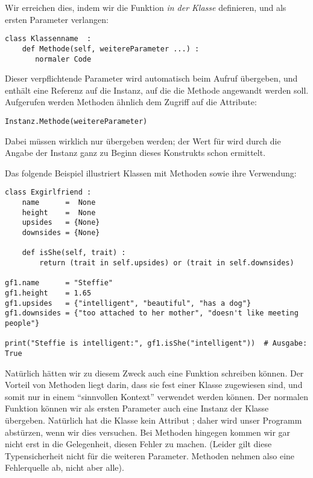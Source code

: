 Wir erreichen dies, indem wir die Funktion \emph{in der Klasse} definieren, und als ersten Parameter  verlangen:
\begin{codebox}
\begin{verbatim}
class Klassenname  :
    def Methode(self, weitereParameter ...) :
       normaler Code
\end{verbatim}
\end{codebox}

Dieser verpflichtende Parameter  wird automatisch beim Aufruf übergeben, und enthält eine Referenz auf die Instanz, auf die die Methode angewandt werden soll. Aufgerufen werden Methoden ähnlich dem Zugriff auf die Attribute:
\begin{codebox}
\begin{verbatim}
Instanz.Methode(weitereParameter)
\end{verbatim}
\end{codebox}

Dabei müssen wirklich nur  übergeben werden; der Wert für  wird durch die Angabe der Instanz ganz zu Beginn dieses Konstrukts schon ermittelt.

Das folgende Beispiel illustriert Klassen mit Methoden sowie ihre Verwendung:
\begin{codebox}
\begin{verbatim}
class Exgirlfriend :
    name      =  None
    height    =  None
    upsides   = {None}
    downsides = {None}
    
    def isShe(self, trait) :
        return (trait in self.upsides) or (trait in self.downsides)

gf1.name      = "Steffie"
gf1.height    = 1.65
gf1.upsides   = {"intelligent", "beautiful", "has a dog"}
gf1.downsides = {"too attached to her mother", "doesn't like meeting people"}

print("Steffie is intelligent:", gf1.isShe("intelligent"))  # Ausgabe: True
\end{verbatim}
\end{codebox}

Natürlich hätten wir zu diesem Zweck auch eine Funktion  schreiben können. Der Vorteil von Methoden liegt darin, dass sie fest einer Klasse zugewiesen sind, und somit nur in einem \enquote{sinnvollen Kontext} verwendet werden können. Der normalen Funktion  können wir als ersten Parameter auch eine Instanz der Klasse  übergeben. Natürlich hat die Klasse  kein Attribut ; daher wird unser Programm abstürzen, wenn wir dies versuchen. Bei Methoden hingegen kommen wir gar nicht erst in die Gelegenheit, diesen Fehler zu machen. (Leider gilt diese Typensicherheit nicht für die weiteren Parameter. Methoden nehmen also eine Fehlerquelle ab, nicht aber alle).

